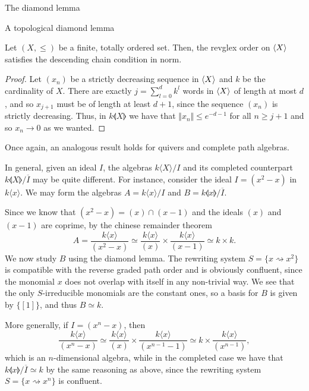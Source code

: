\begin{chapter}{The diamond lemma}
\begin{section}{A topological diamond lemma}
\begin{lemma}\label{noeth-norm}Let $(X,\leq)$ be a finite, totally ordered set. Then, the revglex order on $\langle X\rangle$ satisfies the descending chain condition in norm.
\end{lemma}
\begin{proof} Let $(x_n)$ be a strictly decreasing sequence in $\langle X\rangle$ and $k$ be the cardinality of $X$. There are exactly $j=\sum_{l=0}^d k^l$ words in $\langle X\rangle$ of length at most $d$, and so $x_{j+1}$ must be of length at least $d+1$, since the sequence $(x_n)$ is strictly decreasing. Thus, in $k\llangle X\rrangle$ we have that $\Vert x_{n}\Vert\leq e^{-d-1}$ for all $n\geq j+1$ and so $x_n\rightarrow 0$ as we wanted.
\end{proof}

Once again, an analogous result holds for quivers and complete path algebras.

\begin{exmp}\label{counterexample} In general, given an ideal $I$, the algebras $k\langle X\rangle/I$ and its completed counterpart $k\llangle X\rrangle/\overline{I}$ may be quite different. For instance, consider the ideal $I=(x^2-x)$ in $k\langle x \rangle$. We may form the algebras $A=k\langle x\rangle/I$ and $B=k\llangle x\rrangle/\overline{I}$.

Since we know that $(x^2-x)=(x)\cap(x-1)$ and the ideals $(x)$ and $(x-1)$ are coprime, by the chinese remainder theorem
\[A=\frac{k\langle x\rangle}{(x^2-x)}\simeq \frac{k\langle x\rangle}{(x)} \times \frac{k\langle x\rangle}{(x-1)}\simeq k\times k.\]
We now study $B$ using the diamond lemma. The rewriting system $S=\{x\rightsquigarrow x^2\}$ is compatible with the reverse graded path order and is obviously confluent, since the monomial $x$ does not overlap with itself in any non-trivial way. We see that the only $S$-irreducible monomials are the constant ones, so a basis for $B$ is given by $\{[1]\}$, and thus $B\simeq k$.

More generally, if $I=(x^n-x)$, then
\[\frac{k\langle x\rangle}{(x^n-x)} \simeq \frac{k\langle x\rangle}{(x)}\times \frac{k\langle x\rangle}{(x^{n-1}-1)}\simeq k \times \frac{k\langle x\rangle}{(x^{n-1})},\]
which is an $n$-dimensional algebra, while in the completed case we have that $k\llangle x\rrangle/\overline{I}\simeq k$ by the same reasoning as above, since the rewriting system $S=\{x\rightsquigarrow x^n\}$ is confluent.
\end{exmp}
\end{section}
\end{chapter}